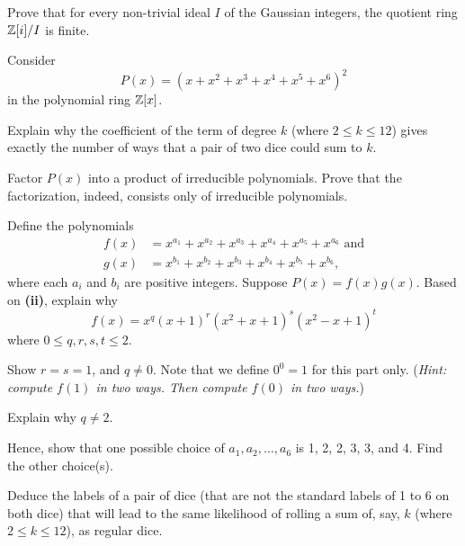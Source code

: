 \begin{problem}
    Prove that for every non-trivial ideal $I$ of the Gaussian integers, the quotient ring $\mathbb{Z}[i]/I$ is finite.
\end{problem}

\newpage

\begin{problem}
    Consider
    \[
        P(x) = (x + x^2 + x^3 + x^4 + x^5 + x^6)^2
    \]
    in the polynomial ring $\mathbb{Z}[x]$.
    \begin{partquestions}{\roman*}
        \item Explain why the coefficient of the term of degree $k$ (where $2 \leq k \leq 12$) gives exactly the number of ways that a pair of two dice could sum to $k$.
        
        \item Factor $P(x)$ into a product of irreducible polynomials. Prove that the factorization, indeed, consists only of irreducible polynomials.
        
        \item Define the polynomials
        \begin{align*}
            f(x) &= x^{a_1} + x^{a_2} + x^{a_3} + x^{a_4} + x^{a_5} + x^{a_6} \text{ and}\\
            g(x) &= x^{b_1} + x^{b_2} + x^{b_3} + x^{b_4} + x^{b_5} + x^{b_6},
        \end{align*}
        where each $a_i$ and $b_i$ are positive integers. Suppose $P(x) = f(x)g(x)$. Based on \textbf{(ii)}, explain why
        \[
            f(x) = x^q(x+1)^r(x^2+x+1)^s(x^2-x+1)^t
        \]
        where $0 \leq q,r,s,t \leq 2$.

        \item Show $r = s = 1$, and $q \neq 0$. Note that we define $0^0 = 1$ for this part only.\newline
        (\textit{Hint: compute $f(1)$ in two ways. Then compute $f(0)$ in two ways.})

        \item Explain why $q \neq 2$.
        
        \item Hence, show that one possible choice of $a_1, a_2, \dots, a_6$ is 1, 2, 2, 3, 3, and 4. Find the other choice(s).
        
        \item Deduce the labels of a pair of dice (that are not the standard labels of 1 to 6 on both dice) that will lead to the same likelihood of rolling a sum of, say, $k$ (where $2 \leq k \leq 12$), as regular dice.
    \end{partquestions}
\end{problem}
